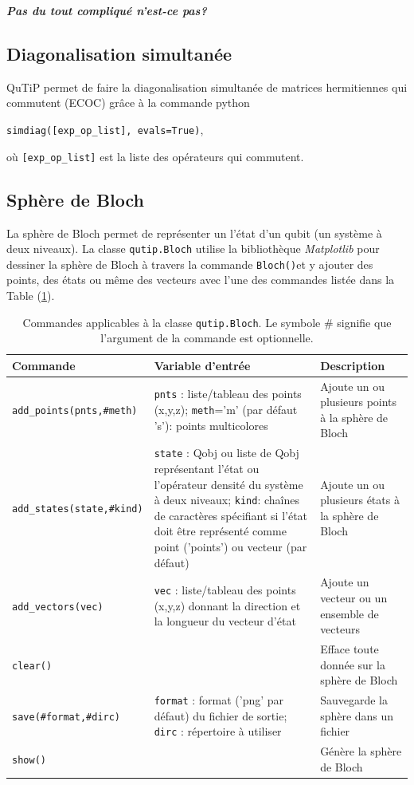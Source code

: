 \textbf{\emph{Pas du tout compliqué n'est-ce pas?}}

\subsection{Diagonalisation simultanée}

QuTiP permet de faire la diagonalisation simultanée de matrices hermitiennes 
qui commutent (ECOC) grâce à la commande python
\begin{center}
 \texttt{simdiag([exp\_op\_list], evals=True)},
\end{center}
où \texttt{[exp\_op\_list]} est la liste des opérateurs qui 
commutent.

\subsection{Sphère de Bloch}
La sphère de Bloch permet de représenter un l'état d'un qubit (un système à 
deux niveaux). La classe \texttt{qutip.Bloch} utilise la bibliothèque
\emph{Matplotlib} pour dessiner la sphère de Bloch à travers la commande 
\texttt{Bloch()}et y ajouter des points, des états ou même des vecteurs avec 
l'une des commandes listée dans la Table (\ref{tab:Bloch}).

\begin{table}[htpb]
\centering
\begin{tabular}{|l|p{5.5cm}|p{4.5cm}|}\hline \hline
\textbf{Commande} & \textbf{Variable d'entrée} & \textbf{Description} \\ \hline 
\hline
\texttt{add\_points(pnts,\#meth)} & \texttt{pnts} : liste/tableau des 
points (x,y,z); \texttt{meth}='m' (par défaut 's'): points multicolores & 
Ajoute un ou plusieurs points à la sphère de Bloch \\ \hline
\texttt{add\_states(state,\#kind)} & \texttt{state} : Qobj ou liste de Qobj 
représentant l'état ou l'opérateur densité du système à deux niveaux;  
\texttt{kind}: chaînes de caractères spécifiant si l'état doit 
être représenté comme point ('points') ou vecteur (par défaut)&  Ajoute un ou 
plusieurs états à la sphère de Bloch \\ \hline
\texttt{add\_vectors(vec)} & \texttt{vec} : liste/tableau des points 
(x,y,z) donnant la direction et la longueur du vecteur d'état & 
Ajoute un vecteur ou un ensemble de vecteurs \\ \hline
\texttt{clear()} & & Efface toute donnée sur la sphère de Bloch \\ \hline
\texttt{save(\#format,\#dirc)} & \texttt{format} : format ('png' par défaut) du 
fichier de sortie; \texttt{dirc} : répertoire à utiliser & Sauvegarde la sphère 
 dans un fichier \\ \hline
\texttt{show()} & & Génère la sphère de Bloch\\ \hline
\end{tabular}
\caption{Commandes applicables à la classe \texttt{qutip.Bloch}. Le symbole \# 
signifie que l'argument de la commande est optionnelle.}
\label{tab:Bloch}
\end{table}

